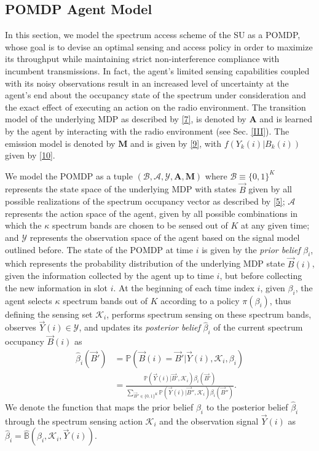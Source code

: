 \documentclass[10pt,twocolumn]{IEEEtran}
\begin{document}
\subsection{POMDP Agent Model}
In this section, we model the spectrum access scheme of the SU as a POMDP, whose goal is to devise an optimal sensing and access policy in order to maximize its throughput while maintaining strict non-interference compliance with incumbent transmissions. In fact, the agent's limited sensing capabilities coupled with its noisy observations result in an increased level of uncertainty at the agent's end about the occupancy state of the spectrum under consideration and the exact effect of executing an action on the radio environment. The transition model of the underlying MDP as described by \eqref{7}, is denoted by $\mathbf{A}$ and is learned by the agent by interacting with the radio environment (see Sec. \ref{III}). The emission model is denoted by $\mathbf{M}$ and is given by \eqref{9}, with $f(Y_k(i)|B_k(i))$ given by \eqref{10}. 

We model the POMDP as a tuple $(\mathcal B,\mathcal{A},\mathcal{Y},\mathbf{A},\mathbf{M})$ where $\mathcal{B}\equiv\{0,1\}^K$ represents the state space of the underlying MDP with states $\vec{B}$ given by all possible realizations of the spectrum occupancy vector as described by \eqref{5}; $\mathcal{A}$ represents the action space of the agent, given by all possible combinations in which the $\kappa$ spectrum bands are chosen to be sensed out of $K$ at any given time; and $\mathcal{Y}$ represents the observation space of the agent based on the signal model outlined before. The state of the POMDP at time $i$ is given by the \emph{prior belief} $\beta_i$, which represents the probability distribution of the underlying MDP state $\vec{B}(i)$, given the information collected by the agent up to time $i$, but before collecting the new information in slot $i$. At the beginning of each time index $i$, given $\beta_i$, the agent selects $\kappa$ spectrum bands out of $K$ according to a policy $\pi(\beta_i)$, thus defining the sensing set $\mathcal K_i$, performs spectrum sensing  on these spectrum bands, observes $\vec{Y}(i){\in} \mathcal{Y}$, and updates its \emph{posterior belief} $\hat{\beta}_i$ of the current spectrum occupancy $\vec{B}(i)$ as 
\begin{align}\label{11}
\hat\beta_i(\vec{B}') &= \mathbb{P}(\vec{B}(i) = \vec{B}'|\vec{Y}(i), \mathcal K_i, \beta_i)\\&=
\nonumber
\frac{\mathbb{P}(\vec{Y}(i)|\vec{B}', \mathcal{K}_i) \beta_i(\vec{B}')}{
\sum_{\vec{B}'' {\in} \{0,1\}^K} \mathbb{P}(\vec{Y}(i)|\vec{B}'', \mathcal{K}_i) \beta_i(\vec{B}'')}.
\end{align}
We denote the function that maps the prior belief $\beta_i$ to the posterior belief $\hat\beta_i$ through the spectrum sensing action $\mathcal K_i$ and the observation signal $\vec{Y}(i)$ as $\hat\beta_i=\hat{\mathbb B}(\beta_i, \mathcal K_i, \vec{Y}(i))$.
\end{document}
